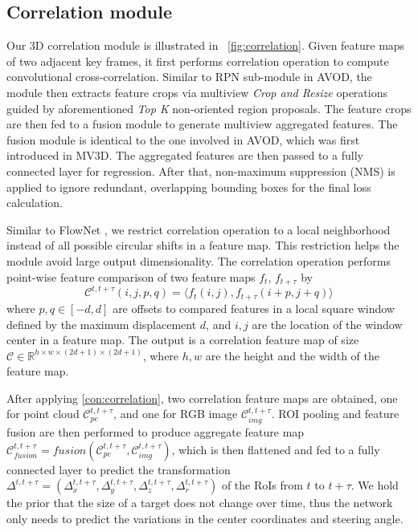 \documentclass{bmvc2k}
\begin{document}
\subsection{Correlation module}
Our 3D correlation module is illustrated in \figurename \, \ref{fig:correlation}. Given feature maps of two adjacent key frames, it first performs correlation operation to compute convolutional cross-correlation. Similar to RPN sub-module in AVOD, the module then extracts feature crops via multiview \textit{Crop and Resize} operations guided by aforementioned \textit{Top K} non-oriented region proposals. The feature crops are then fed to a fusion module to generate multiview aggregated features. The fusion module is identical to the one involved in AVOD, which was first introduced in MV3D\cite{chen2017multi}. The aggregated features are then passed to a fully connected layer for regression. After that, non-maximum suppression (NMS) is applied to ignore redundant, overlapping bounding boxes for the final loss calculation.

Similar to FlowNet \cite{dosovitskiy2015flownet}, we restrict correlation operation to a local neighborhood instead of all possible circular shifts in a feature map. This restriction helps the module avoid large output dimensionality. The correlation operation performs point-wise feature comparison of two feature maps $f_t$, $f_{t+\tau}$ by
\begin{equation}
\mathcal{C}^{t, t+\tau}(i, j, p, q) = \Big \langle f_t(i, j), f_{t+\tau} (i+p, j+q) \Big \rangle \label{con:correlation}
\end{equation}
where $p, q \in [-d, d]$ are offsets to compared features in a local square window defined by the maximum displacement $d$, and $i, j$ are the location of the window center in a feature map. The output is a correlation feature map of size $\mathcal{C} \in \mathbb{R}^{h \times w \times (2d+1) \times (2d+1)}$, where $h, w$ are the height and the width of the feature map.

After applying \eqref{con:correlation}, two correlation feature maps are obtained, one for point cloud $\mathcal{C}^{t, t+\tau}_{pc}$, and one for RGB image $\mathcal{C}^{t, t+\tau}_{img}$. ROI pooling and feature fusion are then performed to produce aggregate feature map $\mathcal{C}^{t,t+\tau}_{fusion} = fusion(\mathcal{C}^{t, t+\tau}_{pc}, \mathcal{C}^{t, t+\tau}_{img})$, which is then flattened and fed to a fully connected layer to predict the transformation $\Delta^{t, t+\tau} = (\Delta^{t,t+\tau}_{x}, \Delta^{t,t+\tau}_{y}, \Delta^{t,t+\tau}_{z}, \Delta^{t,t+\tau}_{r})$ of the RoIs from $t$ to $t+\tau$. We hold the prior that the size of a target does not change over time, thus the network only needs to predict the variations in the center coordinates and steering angle.
\end{document}
